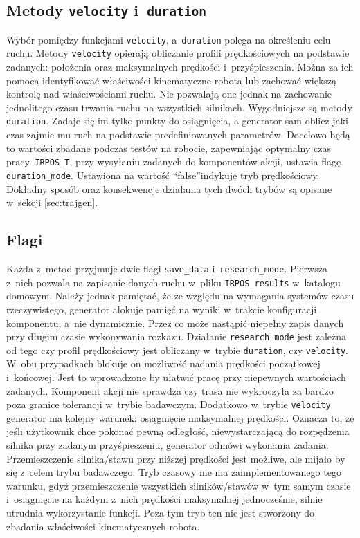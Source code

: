 \documentclass[a4paper, 12pt]{article}
\begin{document}
	\subsection{Metody \texttt{velocity} i~\texttt{duration}} 
	\label{sec:veldurdiff}
	Wybór pomiędzy funkcjami \texttt{velocity}, a~\texttt{duration} polega na określeniu celu ruchu. Metody \texttt{velocity} opierają obliczanie profili prędkościowych na podstawie zadanych: położenia oraz maksymalnych prędkości i~przyśpieszenia. Można za ich pomocą identyfikować właściwości kinematyczne robota lub zachować większą kontrolę nad właściwościami ruchu. Nie pozwalają one jednak na zachowanie jednolitego czasu trwania ruchu na wszystkich silnikach. Wygodniejsze są metody \texttt{duration}. Zadaje się im tylko punkty do osiągnięcia, a generator sam oblicz jaki czas zajmie mu ruch na podstawie predefiniowanych parametrów. Docelowo będą to wartości zbadane podczas testów na robocie, zapewniając optymalny czas pracy. \texttt{IRPOS\_T}, przy wysyłaniu zadanych do komponentów akcji, ustawia flagę \texttt{duration\_mode}. Ustawiona na wartość \textquotedblleft false\textquotedblright indykuje tryb prędkościowy. Dokładny sposób oraz konsekwencje działania tych dwóch trybów są opisane w~sekcji \ref{sec:trajgen}. 
	
	\subsection{Flagi}
	\label{sec:flags}
	Każda z~metod przyjmuje dwie flagi \texttt{save\_data} i~\texttt{research\_mode}. Pierwsza z~nich pozwala na zapisanie danych ruchu w~pliku \texttt{IRPOS\_results} w~katalogu domowym. Należy jednak pamiętać, że ze względu na wymagania systemów czasu rzeczywistego, generator alokuje pamięć na wyniki w~trakcie konfiguracji komponentu, a~nie dynamicznie. Przez co może nastąpić niepełny zapis danych przy długim czasie wykonywania rozkazu. Działanie \texttt{research\_mode} jest zależna od tego czy profil prędkościowy jest obliczany w~trybie \texttt{duration}, czy \texttt{velocity}. W~obu przypadkach blokuje on możliwość nadania prędkości początkowej i~końcowej. Jest to wprowadzone by ułatwić pracę przy niepewnych wartościach zadanych. Komponent akcji nie sprawdza czy trasa nie wykroczyła za bardzo poza granice tolerancji w~trybie badawczym. Dodatkowo w~trybie \texttt{velocity} generator ma kolejny warunek: osiągnięcie maksymalnej prędkości. Oznacza to, że jeśli użytkownik chce pokonać pewną odległość, niewystarczającą do rozpędzenia silnika przy zadanym przyśpieszeniu, generator odmówi wykonania zadania. Przemieszczenie silnika/stawu przy niższej prędkości jest możliwe, ale mijało by się z~celem trybu badawczego. Tryb czasowy nie ma zaimplementowanego tego warunku, gdyż przemieszczenie wszystkich silników/stawów w~tym samym czasie i~osiągnięcie na każdym z~nich prędkości maksymalnej jednocześnie, silnie utrudnia wykorzystanie funkcji. Poza tym tryb ten nie jest stworzony do zbadania właściwości kinematycznych robota. 
	
\end{document}
